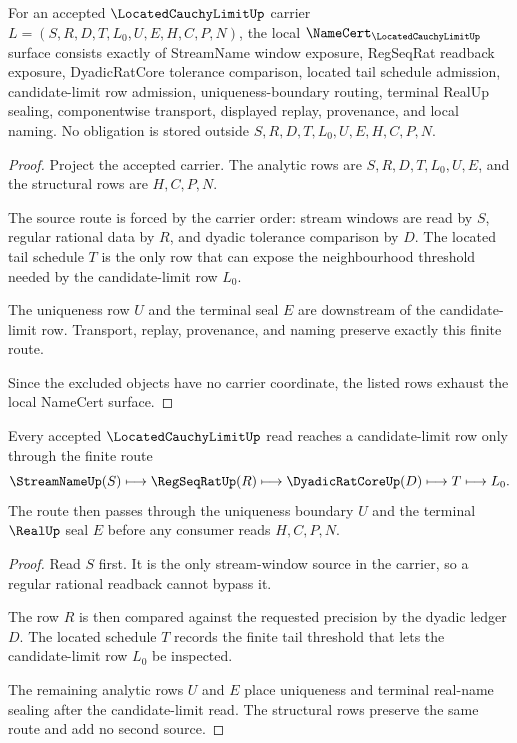 \begin{theorem}
\label{thm:located-cauchy-limit-namecert-obligations}
For an accepted $\LocatedCauchyLimitUp$ carrier $L=(S,R,D,T,L_0,U,E,H,C,P,N)$, the local $\NameCert_{\LocatedCauchyLimitUp}$ surface consists exactly of StreamName window exposure, RegSeqRat readback exposure, DyadicRatCore tolerance comparison, located tail schedule admission, candidate-limit row admission, uniqueness-boundary routing, terminal RealUp sealing, componentwise transport, displayed replay, provenance, and local naming. No obligation is stored outside $S,R,D,T,L_0,U,E,H,C,P,N$.
\end{theorem}
\begin{proof}
Project the accepted carrier. The analytic rows are $S,R,D,T,L_0,U,E$, and the structural rows are $H,C,P,N$.

The source route is forced by the carrier order: stream windows are read by $S$, regular rational data by $R$, and dyadic tolerance comparison by $D$. The located tail schedule $T$ is the only row that can expose the neighbourhood threshold needed by the candidate-limit row $L_0$.

The uniqueness row $U$ and the terminal seal $E$ are downstream of the candidate-limit row. Transport, replay, provenance, and naming preserve exactly this finite route.

Since the excluded objects have no carrier coordinate, the listed rows exhaust the local NameCert surface.
\end{proof}

\begin{theorem}
\label{thm:located-cauchy-limit-regseqrat-route}
Every accepted $\LocatedCauchyLimitUp$ read reaches a candidate-limit row only through the finite route
$$
\StreamNameUp(S) \longmapsto \RegSeqRatUp(R) \longmapsto \DyadicRatCoreUp(D) \longmapsto T \longmapsto L_0.
$$
The route then passes through the uniqueness boundary $U$ and the terminal $\RealUp$ seal $E$ before any consumer reads $H,C,P,N$.
\end{theorem}
\begin{proof}
Read $S$ first. It is the only stream-window source in the carrier, so a regular rational readback cannot bypass it.

The row $R$ is then compared against the requested precision by the dyadic ledger $D$. The located schedule $T$ records the finite tail threshold that lets the candidate-limit row $L_0$ be inspected.

The remaining analytic rows $U$ and $E$ place uniqueness and terminal real-name sealing after the candidate-limit read. The structural rows preserve the same route and add no second source.
\end{proof}

